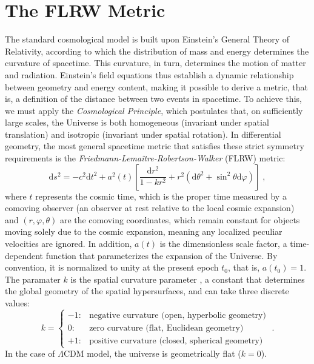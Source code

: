 \documentclass[12pt,a4paper,oneside]{report}
\begin{document}
\section{The FLRW Metric}\label{sec:FLRW_Metric}
The standard cosmological model is built upon Einstein's General Theory of Relativity, according to which the distribution of mass and energy determines the curvature of spacetime. This curvature, in turn, determines the motion of matter and radiation. Einstein's field equations thus establish a dynamic relationship between geometry and energy content, making it possible to derive a metric, that is, a definition of the distance between two events in spacetime. To achieve this, we must apply the \textit{Cosmological Principle}, which postulates that, on sufficiently large scales, the Universe is both homogeneous (invariant under spatial translation) and isotropic (invariant under spatial rotation). In differential geometry, the most general spacetime metric that satisfies these strict symmetry requirements is the \textit{Friedmann-Lemaître-Robertson-Walker} (FLRW) metric:
\begin{equation}
  \mathrm{d}s^2 = -c^2\mathrm{d}t^2 + a^2(t)\left[ \frac{\mathrm{d}r^2}{1 - k r^2} + r^2 \left( \mathrm{d}\theta^2 + \sin^2{\theta} \mathrm{d}\varphi \right) \right] \; ,
  \label{eq:FLRW_Metric}
\end{equation}
where $t$ represents the cosmic time, which is the proper time measured by a comoving observer (an observer at rest relative to the local cosmic expansion) and $(r,\varphi,\theta)$ are the comoving coordinates, which remain constant for objects moving solely due to the cosmic expansion, meaning any localized peculiar velocities are ignored. In addition, $a(t)$ is the dimensionless scale factor, a time-dependent function that parameterizes the expansion of the Universe. By convention, it is normalized to unity at the present epoch $t_0$, that is, $a(t_0) = 1$. The paramater $k$ is the spatial curvature parameter \cite{CurvatureScalar}, a constant that determines the global geometry of the spatial hypersurfaces, and can take three discrete values:
\[
k =
\begin{cases}
  -1: & \text{negative curvature (open, hyperbolic geometry)} \\
  0: & \text{zero curvature (flat, Euclidean geometry)} \\
  +1: & \text{positive curvature (closed, spherical geometry)}
\end{cases}\label{eq:k_param} \; .
\]
In the case of $\Lambda\mathrm{CDM}$ model, the universe is geometrically flat ($k = 0$).
\end{document}

